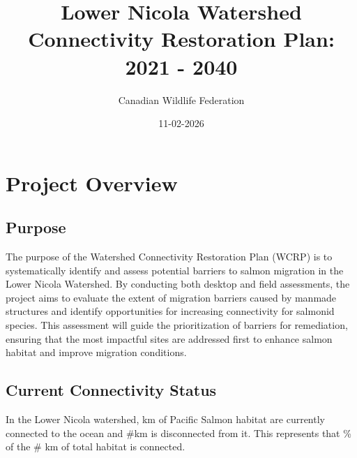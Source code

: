 \documentclass[
  letterpaper,
  DIV=11,
  numbers=noendperiod]{scrreprt}
\title{Lower Nicola Watershed Connectivity Restoration Plan: 2021 -
2040}
\author{Canadian Wildlife Federation}
\date{11-02-2026}
\renewcommand*\contentsname{Table of contents}
\newcommand\contentsname{Table of contents}
\begin{document}
\maketitle
\ifdefined\Shaded\renewenvironment{Shaded}{\begin{tcolorbox}[sharp corners, breakable, boxrule=0pt, frame hidden, borderline west={3pt}{0pt}{shadecolor}, interior hidden, enhanced]}{\end{tcolorbox}}\fi

\renewcommand*\contentsname{Table of contents}
{
\hypersetup{linkcolor=}
\setcounter{tocdepth}{1}
\tableofcontents
}

\hypertarget{project-overview}{%
\chapter*{Project Overview}\label{project-overview}}


\hypertarget{purpose}{%
\section*{Purpose}\label{purpose}}


The purpose of the Watershed Connectivity Restoration Plan (WCRP) is to
systematically identify and assess potential barriers to salmon
migration in the Lower Nicola Watershed. By conducting both desktop and
field assessments, the project aims to evaluate the extent of migration
barriers caused by manmade structures and identify opportunities for
increasing connectivity for salmonid species. This assessment will guide
the prioritization of barriers for remediation, ensuring that the most
impactful sites are addressed first to enhance salmon habitat and
improve migration conditions.

\hypertarget{current-connectivity-status}{%
\section*{Current Connectivity
Status}\label{current-connectivity-status}}


In the Lower Nicola watershed, km of Pacific Salmon habitat are
currently connected to the ocean and \#km is disconnected from it. This
represents that \% of the \# km of total habitat is connected.
\end{document}
